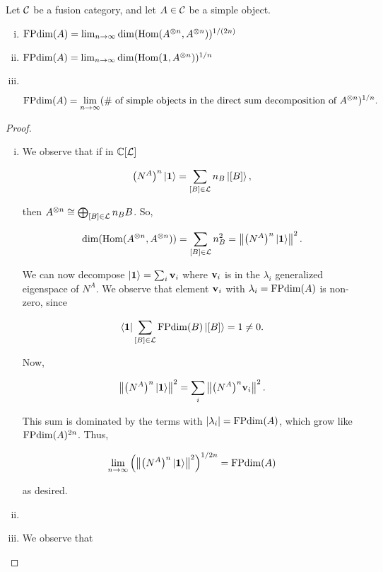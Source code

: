 \begin{prop}\label{tensor-power-growth} Let ${\mathcal C}$ be a fusion category, and let $A\in {\mathcal C}$ be a simple object.

\begin{enumerate}[(i)]
\item $\operatorname{FPdim}(A)=\lim_{n\to\infty}\dim(\operatorname{Hom}(A^{\otimes n},A^{\otimes n}))^{1/(2n)}$
\item $\operatorname{FPdim}(A)=\lim_{n\to\infty}\dim(\operatorname{Hom}({\mathbf 1},A^{\otimes n}))^{1/n}$
\item $\,$

$$\operatorname{FPdim}(A)=\lim_{n\to\infty}(\text{\# of simple objects in the direct sum decomposition of $A^{\otimes n}$})^{1/n}.$$
\end{enumerate}
\end{prop}
\begin{proof}
\begin{enumerate}[(i)]
\item  We observe that if in ${\mathbb C}[{\mathcal L}]$

$$\big(N^A\big)^n\ket{{\mathbf 1}}=\sum_{[B]\in {\mathcal L}}n_B \ket{[B]},$$

then $A^{\otimes n}\cong \bigoplus_{[B]\in {\mathcal L}}n_B B$. So,

$$\dim(\operatorname{Hom}(A^{\otimes n},A^{\otimes n}))=\sum_{[B]\in {\mathcal L}}n_B^2= \left \lVert \big(N^A\big)^n\ket{{\mathbf 1}} \right \rVert^2.$$

We can now decompose $\ket{{\mathbf 1}}=\sum_i \bold{v}_i$ where $\bold{v}_i$ is in the $\lambda_i$ generalized eigenspace of $N^A$. We observe that element $\bold{v}_{i}$ with $\lambda_i=\operatorname{FPdim}(A)$ is non-zero, since 

$$\bra{{\mathbf 1}} \sum_{[B]\in {\mathcal L}} \operatorname{FPdim}(B)\ket{[B]}=1\neq 0.$$

Now, 

$$\left \lVert \big(N^A\big)^n\ket{{\mathbf 1}} \right \rVert^2=\sum_{i}\left \lVert \big(N^A\big)^n\bold{v}_i \right \rVert^2.$$

This sum is dominated by the terms with $|\lambda_i|=\operatorname{FPdim}(A)$, which grow like $\operatorname{FPdim}(A)^{2n}$. Thus,

$$\lim_{n\to \infty}\left(\left \lVert \big(N^A\big)^n\ket{{\mathbf 1}} \right \rVert^2\right)^{1/2n}=\operatorname{FPdim}(A)$$

as desired.

\item {}

\item We observe that


\end{enumerate}
\end{proof}
